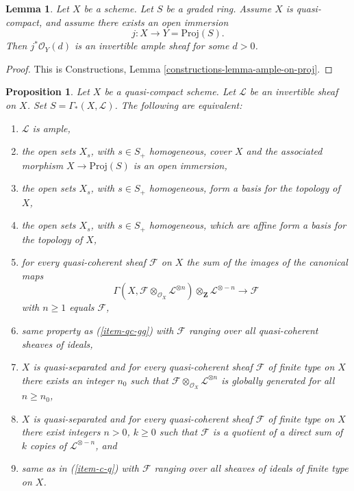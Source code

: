 \documentclass{stacks-project}
\theoremstyle{plain}
\newtheorem{proposition}[subsection]{Proposition}
\newtheorem{lemma}[subsection]{Lemma}
\theoremstyle{definition}
\theoremstyle{remark}
\numberwithin{equation}{subsection}
\begin{document}
\begin{lemma}
\label{lemma-open-in-proj-ample}
Let $X$ be a scheme.
Let $S$ be a graded ring. Assume $X$ is quasi-compact,
and assume there exists an open immersion
$$
j : X \longrightarrow Y = \text{Proj}(S).
$$
Then $j^*\mathcal{O}_Y(d)$ is an invertible ample sheaf
for some $d > 0$.
\end{lemma}

\begin{proof}
This is Constructions, Lemma \ref{constructions-lemma-ample-on-proj}.
\end{proof}

\begin{proposition}
\label{proposition-characterize-ample}
Let $X$ be a quasi-compact scheme.
Let $\mathcal{L}$ be an invertible sheaf on $X$.
Set $S = \Gamma_*(X, \mathcal{L})$.
The following are equivalent:
\begin{enumerate}
\item
\label{item-ample}
$\mathcal{L}$ is ample,
\item
\label{item-immersion}
the open sets $X_s$, with $s \in S_{+}$ homogeneous,
cover $X$ and the associated morphism $X \to \text{Proj}(S)$
is an open immersion,
\item
\label{item-s-basis}
the open sets $X_s$, with $s \in S_{+}$ homogeneous,
form a basis for the topology of $X$,
\item
\label{item-s-affine-basis}
the open sets $X_s$, with $s \in S_{+}$ homogeneous,
which are affine form a basis for the topology of $X$,
\item
\label{item-qc-gg}
for every quasi-coherent sheaf $\mathcal{F}$ on $X$
the sum of the images of the canonical maps
$$
\Gamma(X, \mathcal{F} \otimes_{\mathcal{O}_X} \mathcal{L}^{\otimes n})
\otimes_{\mathbf{Z}} \mathcal{L}^{\otimes -n}
\longrightarrow
\mathcal{F}
$$
with $n \geq 1$ equals $\mathcal{F}$,
\item
\label{item-qc-i-gg}
same property as (\ref{item-qc-gg}) with $\mathcal{F}$
ranging over all quasi-coherent sheaves of ideals,
\item
\label{item-c-gg}
$X$ is quasi-separated and
for every quasi-coherent sheaf $\mathcal{F}$ of finite type on $X$
there exists an integer $n_0$ such that
$\mathcal{F} \otimes_{\mathcal{O}_X} \mathcal{L}^{\otimes n}$
is globally generated for all $n \geq n_0$,
\item
\label{item-c-q}
$X$ is quasi-separated and
for every quasi-coherent sheaf $\mathcal{F}$ of finite type on $X$
there exist integers $n > 0$, $k \geq 0$ such that
$\mathcal{F}$ is a quotient of a direct sum of $k$ copies of
$\mathcal{L}^{\otimes - n}$, and
\item
\label{item-c-i-q}
same as in (\ref{item-c-q}) with $\mathcal{F}$ ranging over all
sheaves of ideals of finite type on $X$.
\end{enumerate}
\end{proposition}
\end{document}
